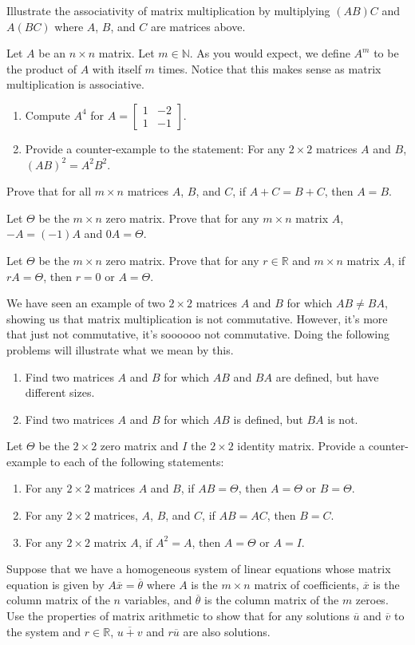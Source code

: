 \documentclass[12pt]{article}
\def\it{\item}
\def\be{\begin{enumerate}} \def\ee{\end{enumerate}}
\def\bar#1{\overline{#1}}
\def\th{\theta} \def\al{\alpha} \def\ba{\beta} \def\ga{\gamma}
\def\R{\mathbb{R}} \def\Q{\mathbb{Q}} \def\N{\mathbb{N}} \def\Z{\mathbb{Z}} \def\P{\mathbb{P}}
\begin{document}
\it Illustrate the associativity of matrix multiplication by multiplying $(AB)C$ and $A(BC)$ where $A$, $B$, and $C$ are matrices above.

\it Let $A$ be an $n \times n$ matrix. Let $m \in \N$. As you would expect, we define $A^m$ to be the product of $A$ with itself $m$ times. Notice that this makes 
	sense as matrix multiplication is associative. 
	\be
	\it Compute $A^4$ for $A = \begin{bmatrix} 1 & -2 \\ 1 & -1 \end{bmatrix}$. 
	\it Provide a counter-example to the statement: For any $2 \times 2$ matrices $A$ and $B$, $(AB)^2 = A^2 B^2$.
	\ee

\it Prove that for all $m \times n$ matrices $A$, $B$, and $C$, if $A + C = B + C$, then $A = B$.

\it Let $\Theta$ be the $m \times n$ zero matrix. Prove that for any $m \times n$ matrix $A$, $-A = (-1)A$ and $0A = \Theta$.

\it Let $\Theta$ be the $m \times n$ zero matrix. Prove that for any $r \in \R$ and $m \times n$ matrix $A$, if $rA = \Theta$, then $r = 0$ or $A = \Theta$.

\it We have seen an example of two $2 \times 2$ matrices $A$ and $B$ for which $AB \not= BA$, showing us that matrix multiplication is not commutative.
	However, it's more that just not commutative, it's soooooo not commutative. Doing the following problems will illustrate what we mean by this.
	\be
	\it Find two matrices $A$ and $B$ for which $AB$ and $BA$ are defined, but have different sizes.
	\it Find two matrices $A$ and $B$ for which $AB$ is defined, but $BA$ is not.
	\ee
\it Let $\Theta$ be the $2 \times 2$ zero matrix and $I$ the $2 \times 2$ identity matrix. Provide a counter-example to each of the following statements:
	\be
	\it For any $2 \times 2$ matrices $A$ and $B$, if $AB = \Theta$, then $A = \Theta$ or $B = \Theta$.
	\it For any $2 \times 2$ matrices, $A$, $B$, and $C$, if $AB = AC$, then $B = C$.
	\it For any $2 \times 2$ matrix $A$, if $A^2 = A$, then $A = \Theta$ or $A = I$.
	\ee

\it Suppose that we have a homogeneous system of linear equations whose matrix equation is given by $A\bar{x} = \bar{\th}$ where $A$ is the $m \times n$ matrix of 
	coefficients, $\bar{x}$ is the column matrix of the $n$ variables, and $\bar{\th}$ is the column matrix of the $m$ zeroes. Use the properties of matrix
	arithmetic to show that for any solutions $\bar{u}$ and $\bar{v}$ to the system and $r \in \R$, $\bar{u+v}$ and $r\bar{u}$ are also solutions.
\end{document}
